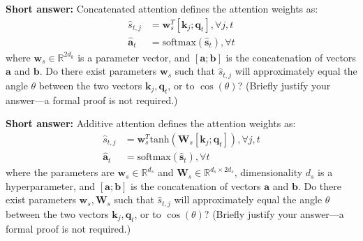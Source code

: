 \documentclass[11pt,addpoints,answers]{exam}
\newcommand{\Rb}{\mathbb{R}}
\newcommand{\av}{\mathbf{a}}
\newcommand{\bv}{\mathbf{b}}
\newcommand{\kv}{\mathbf{k}}
\newcommand{\qv}{\mathbf{q}}
\newcommand{\sv}{\mathbf{s}}
\newcommand{\wv}{\mathbf{w}}
\newcommand{\Wv}{\mathbf{W}}
\begin{document}
\begin{questions}
\begin{parts}
\begin{subparts}
    \subpart[2] \textbf{Short answer:} Concatenated attention defines the attention weights as:
    \begin{align*}
        \hat{s}_{t,j} &= \wv_s^T [ \kv_j ; \qv_t ], \forall j,t\\
        \hat{\av}_t &= \text{softmax}(\hat{\sv}_t), \forall t
    \end{align*}
    where $\wv_s \in \Rb^{2d_k}$ is a parameter vector, and $[\av; \bv]$ is the concatenation of vectors $\av$ and $\bv$.
    Do there exist parameters $\wv_s$ such that $\hat{s}_{t,j}$ will approximately equal the angle $\theta$ between the two vectors $\kv_j,\qv_t$, or to $\cos(\theta)$? (Briefly justify your answer---a formal proof is not required.)

    \begin{answer_box}[title=,height=4cm,width=15cm]
    \end{answer_box}

\clearpage

    \subpart[2] \textbf{Short answer:} Additive attention defines the attention weights as:
    \begin{align*}
        \hat{s}_{t,j} &= \wv_s^T \text{tanh}(\Wv_s [ \kv_j ; \qv_t ]), \forall j,t\\
        \hat{\av}_t &= \text{softmax}(\hat{\sv}_t), \forall t
    \end{align*}
    where the parameters are $\wv_s \in \Rb^{d_s}$ and $\Wv_s \in \Rb^{d_s \times 2d_s}$, dimensionality $d_s$ is a hyperparameter, and $[\av; \bv]$ is the concatenation of vectors $\av$ and $\bv$.
    Do there exist parameters $\wv_s, \Wv_s$ such that $\hat{s}_{t,j}$ will approximately equal the angle $\theta$ between the two vectors $\kv_j,\qv_t$, or to $\cos(\theta)$? (Briefly justify your answer---a formal proof is not required.)

    \begin{answer_box}[title=,height=4cm,width=15cm]
    \end{answer_box}

\end{subparts}



\end{parts}
\end{questions}
\end{document}
